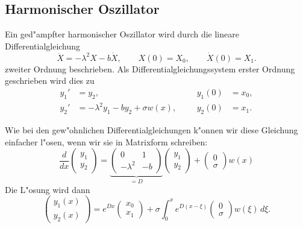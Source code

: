 \subsection{Harmonischer Oszillator\label{linear:harmosz}}
Ein ged"ampfter harmonischer Oszillator wird durch die lineare
Differentialgleichung
\begin{equation}
\ddot X=-\lambda^2 X-b\dot X,\qquad X(0)=X_0,\qquad \dot X(0)=X_1.
\label{linear:harmosz-dgl2}
\end{equation}
zweiter Ordnung beschrieben.
Als Differentialgleichungssystem erster Ordnung geschrieben wird dies zu
\begin{equation}
\begin{aligned}
y_1'&=y_2,                              &&&y_1(0)&=x_0, \\
y_2'&=-\lambda^2 y_1-by_2 + \sigma w(x),&&&y_2(0)&=x_1.
\end{aligned}
\label{stochastsich:harmosz-dgl1}
\end{equation}

Wie bei den gew"ohnlichen Differentialgleichungen k"onnen wir diese
Gleichung einfacher l"osen, wenn wir sie in Matrixform schreiben:
\begin{equation}
\frac{d}{dx} \begin{pmatrix}y_1\\y_2\end{pmatrix}
=
\underbrace{
\begin{pmatrix}
         0& 1\\
-\lambda^2&-b
\end{pmatrix}}_{\textstyle=D}
\begin{pmatrix}y_1\\y_2\end{pmatrix}
+
\begin{pmatrix}
0\\\sigma
\end{pmatrix}w(x)
\end{equation}
Die L"osung wird dann
\begin{equation}
\begin{pmatrix}
y_1(x)\\y_2(x)
\end{pmatrix}
=
e^{Dx}\begin{pmatrix}x_0\\x_1\end{pmatrix}
+
\sigma \int_0^x e^{D(x-\xi)}\begin{pmatrix}0\\\sigma\end{pmatrix}w(\xi)\,d\xi.
\label{linear:harmosz-explsg}
\end{equation}

